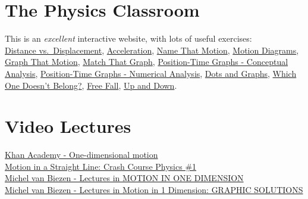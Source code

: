 \documentclass[
  letterpaper,
  DIV=11,
  numbers=noendperiod]{scrreprt}
\begin{document}

\section*{The Physics Classroom}\label{the-physics-classroom}


This is an \emph{excellent} interactive website, with lots of useful
exercises:\\
\href{http://www.physicsclassroom.com/Concept-Builders/Kinematics/Distance-vs-Displacement/Interactive}{Distance
vs.~Displacement}, \url{Acceleration},
\href{http://www.physicsclassroom.com/Concept-Builders/Kinematics/Name-That-Motion/Concept-Builder}{Name
That Motion},
\href{http://www.physicsclassroom.com/Concept-Builders/Kinematics/Motion-Diagrams/Interactive}{Motion
Diagrams},
\href{http://www.physicsclassroom.com/Concept-Builders/Kinematics/Graph-That-Motion/Concept-Builder}{Graph
That Motion}, \href{Match\%20That\%20Graph}{Match That Graph},
\href{http://www.physicsclassroom.com/Concept-Builders/Kinematics/Position-Time-Graphs-Conceptual-Analysis/Concept-Builder}{Position-Time
Graphs - Conceptual Analysis},
\href{http://www.physicsclassroom.com/Concept-Builders/Kinematics/Position-Time-Graphs/Concept-Builder}{Position-Time
Graphs - Numerical Analysis},
\href{http://www.physicsclassroom.com/Concept-Builders/Kinematics/Dots-And-Graphs/Concept-Builder}{Dots
and Graphs},
\href{http://www.physicsclassroom.com/Concept-Builders/Kinematics/Which-One-Doesnt-Belong/Concept-Builder}{Which
One Doesn't Belong?},
\href{http://www.physicsclassroom.com/Concept-Builders/Kinematics/Free-Fall/Concept-Builder}{Free
Fall},
\href{http://www.physicsclassroom.com/Concept-Builders/Kinematics/Up-and-Down/Concept-Builder}{Up
and Down}.

\section*{Video Lectures}\label{video-lectures}


\href{https://www.khanacademy.org/science/physics/one-dimensional-motion}{Khan
Academy - One-dimensional motion}\\
\href{https://www.youtube.com/watch?v=ZM8ECpBuQYE}{Motion in a Straight
Line: Crash Course Physics \#1}\\
\href{http://www.ilectureonline.com/lectures/subject/PHYSICS/1/9}{Michel
van Biezen - Lectures in MOTION IN ONE DIMENSION}\\
\href{http://www.ilectureonline.com/lectures/subject/PHYSICS/1/230}{Michel
van Biezen - Lectures in Motion in 1 Dimension: GRAPHIC SOLUTIONS}
\end{document}
